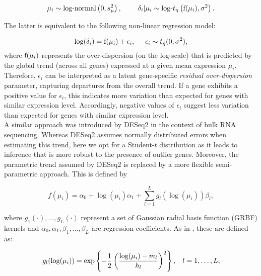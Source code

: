 \begin{equation} \label{eq::jointprior} \mu_i \sim \mbox{log-normal}\left(0, s^2_{\mu}\right), \hspace{0.8cm}
\delta_i | \mu_i \sim \mbox{log-}t_{\eta}\left( \textnormal{f}(\mu_i), \sigma^2 \right).
\end{equation} 

The latter is equivalent to the following non-linear regression model:

\begin{equation} \label{eq::regression}
\log(\delta_i) =\textnormal{f}(\mu_i)+\epsilon_i, \hspace{0.5cm} \epsilon_i \sim{}t_{\eta}(0,\sigma^2), 
\end{equation} where $\textnormal{f}(\mu_i)$ represents the over-dispersion (on the log-scale) that is predicted by the global trend (across all genes) expressed at a given mean expression $\mu_i$. Therefore, $\epsilon_i$ can be interpreted as a latent gene-specific {\it residual over-dispersion} parameter, capturing departures from the overall trend. If a gene exhibits a positive value for $\epsilon_i$, this indicates more variation than expected for genes with similar expression level. Accordingly, negative values of $\epsilon_i$ suggest less variation than expected for genes with similar expression level. \\ 

A similar approach was introduced by DESeq2 \citep{Love2014} in the context of bulk RNA sequencing. Whereas DESeq2 assumes normally distributed errors when estimating this trend, here we opt for a Student-$t$ distribution as it leads to inference that is more robust to the presence of outlier genes. Moreover, the parametric trend assumed by DESeq2 is replaced by a more flexible semi-parametric approach. This is defined by

\begin{equation} \label{eq::trend}
f(\mu_i) = \alpha_0 + \log(\mu_i)\alpha_1 + \sum_{l=1}^L g_l(\log(\mu_i))\beta_l,
\end{equation} 

where $g_1(\cdot), \ldots, g_L(\cdot)$ represent a set of Gaussian radial basis function (GRBF) kernels and $\alpha_0, \alpha_1, \beta_1, \ldots, \beta_L$ are regression coefficients. As in \cite{Kapourani2016}, these are defined as: 

\begin{equation} \label{eq::GRBF}
g_l(\log(\mu_i)) = \exp\left\lbrace-\frac{1}{2}\left(\dfrac{\log(\mu_i)-m_l}{h_l}\right)^2\right\rbrace, \hspace{0.3cm} l = 1, \ldots, L,
\end{equation} 

